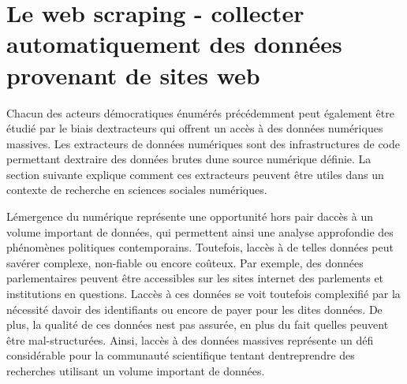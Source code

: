 \documentclass[
  letterpaper,
  DIV=11,
  numbers=noendperiod]{scrreprt}
\begin{document}
\section{\texorpdfstring{\textbf{Le web scraping - collecter
automatiquement des données provenant de sites
web}}{Le web scraping - collecter automatiquement des données provenant de sites web}}\label{le-web-scraping---collecter-automatiquement-des-donnuxe9es-provenant-de-sites-web}

Chacun des acteurs démocratiques énumérés précédemment peut également
être étudié par le biais d\textquotesingle extracteurs qui offrent un
accès à des données numériques massives. Les extracteurs de données
numériques sont des infrastructures de code permettant
d\textquotesingle extraire des données brutes d\textquotesingle une
source numérique définie. La section suivante explique comment ces
extracteurs peuvent être utiles dans un contexte de recherche en
sciences sociales numériques.

L\textquotesingle émergence du numérique représente une opportunité hors
pair d\textquotesingle accès à un volume important de données, qui
permettent ainsi une analyse approfondie des phénomènes politiques
contemporains. Toutefois, l\textquotesingle accès à de telles données
peut s\textquotesingle avérer complexe, non-fiable ou encore coûteux.
Par exemple, des données parlementaires peuvent être accessibles sur les
sites internet des parlements et institutions en questions.
L\textquotesingle accès à ces données se voit toutefois complexifié par
la nécessité d\textquotesingle avoir des identifiants ou encore de payer
pour les dites données. De plus, la qualité de ces données
n\textquotesingle est pas assurée, en plus du fait
qu\textquotesingle elles peuvent être mal-structurées. Ainsi,
l\textquotesingle accès à des données massives représente un défi
considérable pour la communauté scientifique tentant
d\textquotesingle entreprendre des recherches utilisant un volume
important de données.
\end{document}
